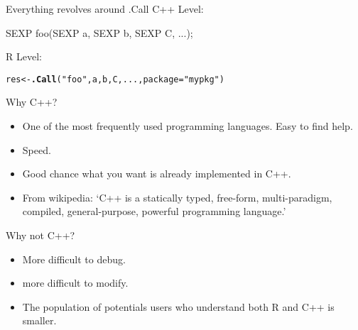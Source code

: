 \documentclass{beamer}\usepackage[]{graphicx}\usepackage[]{color}
\makeatletter
\newcommand{\hlstr}[1]{\textcolor[rgb]{0.192,0.494,0.8}{#1}}%
\newcommand{\hlstd}[1]{\textcolor[rgb]{0.345,0.345,0.345}{#1}}%
\newcommand{\hlkwb}[1]{\textcolor[rgb]{0.69,0.353,0.396}{#1}}%
\newcommand{\hlkwc}[1]{\textcolor[rgb]{0.333,0.667,0.333}{#1}}%
\newcommand{\hlkwd}[1]{\textcolor[rgb]{0.737,0.353,0.396}{\textbf{#1}}}%
\newenvironment{kframe}{%
 \def\at@end@of@kframe{}%
 \ifinner\ifhmode%
  \def\at@end@of@kframe{\end{minipage}}%
  \begin{minipage}{\columnwidth}%
 \fi\fi%
 \def\FrameCommand##1{\hskip\@totalleftmargin \hskip-\fboxsep
 \colorbox{shadecolor}{##1}\hskip-\fboxsep
     \hskip-\linewidth \hskip-\@totalleftmargin \hskip\columnwidth}%
 \MakeFramed {\advance\hsize-\width
   \@totalleftmargin\z@ \linewidth\hsize
   \@setminipage}}%
 {\par\unskip\endMakeFramed%
 \at@end@of@kframe}
\newenvironment{knitrout}{}{} %
\makeatother
\begin{document}
\begin{frame}[fragile]{Everything revolves around .Call}
C++ Level:
\begin{verbatimtab}
SEXP foo(SEXP a, SEXP b, SEXP C, ...);
\end{verbatimtab}
R Level:
\begin{knitrout}\footnotesize
{}\color{fgcolor}\begin{kframe}
\begin{alltt}
\hlstd{res} \hlkwb{<-} \hlkwd{.Call}\hlstd{(}\hlstr{"foo"}\hlstd{, a, b, C, ...,} \hlkwc{package}\hlstd{=}\hlstr{"mypkg"}\hlstd{)}
\end{alltt}
\end{kframe}
\end{knitrout}
\end{frame}
\begin{frame}[fragile]{Why C++?}
    \vspace{1em}
    \begin{itemize}\itemsep1em
        \item One of the most frequently used programming languages. Easy to
            find help.
        \item Speed.
        \item Good chance what you want is already implemented in C++.
        \item From wikipedia: `C++ is a statically typed, free-form, multi-paradigm, 
            compiled, general-purpose, powerful programming language.'
    \end{itemize}
\end{frame}
\begin{frame}[fragile]{Why not C++?}
    \vspace{1em}
    \begin{itemize}\itemsep1em
        \item More difficult to debug.
        \item more difficult to modify.
        \item The population of potentials users who understand both R and
            C++ is smaller.
    \end{itemize}
\end{frame}
\end{document}
